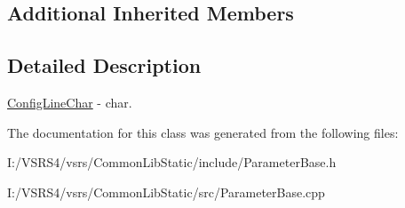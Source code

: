 \subsection*{Additional Inherited Members}


\subsection{Detailed Description}
\hyperlink{class_config_line_char}{Config\+Line\+Char} -\/ char. 

The documentation for this class was generated from the following files\+:\begin{DoxyCompactItemize}
\item 
I\+:/\+V\+S\+R\+S4/vsrs/\+Common\+Lib\+Static/include/Parameter\+Base.\+h\item 
I\+:/\+V\+S\+R\+S4/vsrs/\+Common\+Lib\+Static/src/Parameter\+Base.\+cpp\end{DoxyCompactItemize}

